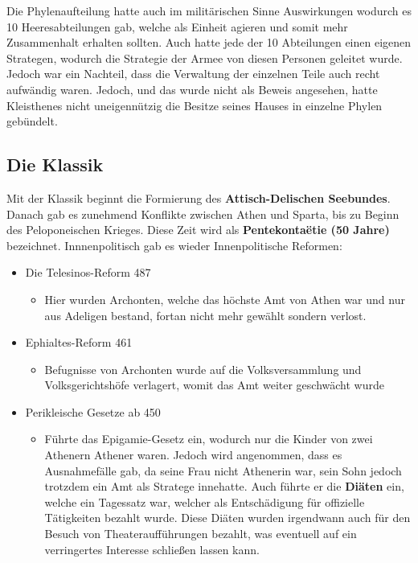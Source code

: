 \documentclass{article}
\begin{document}
	Die Phylenaufteilung hatte auch im militärischen Sinne Auswirkungen wodurch es 10 Heeresabteilungen gab, welche als Einheit agieren und somit mehr Zusammenhalt erhalten sollten. Auch hatte jede der 10 Abteilungen einen eigenen Strategen, wodurch die Strategie der Armee von diesen Personen geleitet wurde. \\
	Jedoch war ein Nachteil, dass die Verwaltung der einzelnen Teile auch recht aufwändig waren. Jedoch, und das wurde nicht als Beweis angesehen, hatte Kleisthenes nicht uneigennützig die Besitze seines Hauses in einzelne Phylen gebündelt. \\
	\subsection{Die Klassik}

	Mit der Klassik beginnt die Formierung des \textbf{Attisch-Delischen Seebundes}. Danach gab es zunehmend Konflikte zwischen Athen und Sparta, bis zu Beginn des Peloponeischen Krieges. Diese Zeit wird als \textbf{Pentekontaëtie (50 Jahre)} bezeichnet.
	Innnenpolitisch gab es wieder Innenpolitische Reformen:
	\begin{itemize}
		\item{Die Telesinos-Reform 487}
		\begin{itemize}
			\item{Hier wurden Archonten, welche das höchste Amt von Athen war und nur aus Adeligen bestand, fortan nicht mehr gewählt sondern verlost.}
		\end{itemize}
		\item{Ephialtes-Reform 461}
		\begin{itemize}
			\item{Befugnisse von Archonten wurde auf die Volksversammlung und Volksgerichtshöfe verlagert, womit das Amt weiter geschwächt wurde}
		\end{itemize}
		\item{Perikleische Gesetze ab 450}
		\begin{itemize}
			\item{Führte das Epigamie-Gesetz ein, wodurch nur die Kinder von zwei Athenern Athener waren. Jedoch wird angenommen, dass es Ausnahmefälle gab, da seine Frau nicht Athenerin war, sein Sohn jedoch trotzdem ein Amt als Stratege innehatte. Auch führte er die \textbf{Diäten} ein, welche ein Tagessatz war, welcher als Entschädigung für offizielle Tätigkeiten bezahlt wurde. Diese Diäten wurden irgendwann auch für den Besuch von Theateraufführungen bezahlt, was eventuell auf ein verringertes Interesse schließen lassen kann.}
		\end{itemize}
	\end{itemize}
\end{document}
